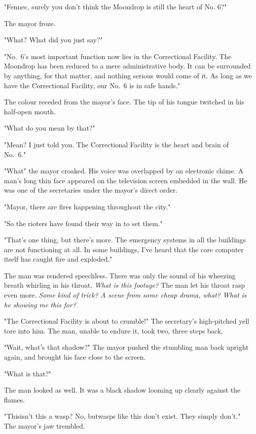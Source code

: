 "Fennec, surely you don't think the Moondrop is still the heart of No.
6?"

The mayor froze.

"What? What did you just say?"

"No.~6's most important function now lies in the Correctional Facility.
The Moondrop has been reduced to a mere administrative body. It can be
surrounded by anything, for that matter, and nothing serious would come
of it. As long as we have the Correctional Facility, our No.~6 is in
safe hands."

The colour receded from the mayor's face. The tip of his tongue twitched
in his half-open mouth.

"What do you mean by that?"

"Mean? I just told you. The Correctional Facility is the heart and brain
of No.~6."

"What\el " the mayor croaked. His voice was overlapped by an electronic
chime. A man's long thin face appeared on the television screen embedded
in the wall. He was one of the secretaries under the mayor's direct
order.

"Mayor, there are fires happening throughout the city."

"So the rioters have found their way in to set them."

"That's one thing, but there's more. The emergency systems in all the
buildings are not functioning at all. In some buildings, I've heard that
the core computer itself has caught fire and exploded."

The man was rendered speechless. There was only the sound of his
wheezing breath whirling in his throat. \emph{What is this footage?} The man
let his throat rasp even more. \emph{Some kind of trick? A scene from some
cheap drama, what? What is he showing me this for?}

"The Correctional Facility is about to crumble!" The secretary's
high-pitched yell tore into him. The man, unable to endure it, took two,
three steps back.

"Wait, what's that shadow?" The mayor pushed the stumbling man back
upright again, and brought his face close to the screen.

"What is that?"

The man looked as well. It was a black shadow looming up clearly against
the flames.

"This\el isn't this a wasp? No, but\el wasps like this don't exist. They
simply don't." The mayor's jaw trembled.

